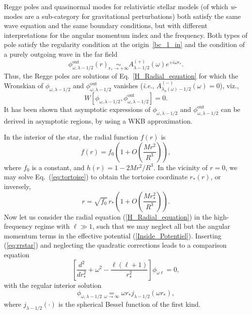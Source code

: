 \documentclass[aps,prd,longbibliography,reprint,twocolumn,amsmath,amssymb,amsfonts,showpacs,footnote,superscriptaddress]{revtex4-1}%
\newcommand{\phiout}{\phi^{\text{out}}_{\omega, \lambda-1/2}}
\newcommand{\phireg}{\phi^{}_{\omega, \lambda-1/2}}
\begin{document}
Regge poles and quasinormal modes for relativistic stellar models (of which \textit{w}-modes are a sub-category for gravitational perturbations) both satisfy the same wave equation and the same boundary conditions, but with different interpretations for the angular momentum index and the frequency. Both types of pole satisfy the regularity condition at the origin~\eqref{bc_1_in} and the condition of a purely outgoing wave in the far field
%
\begin{equation}\label{bc_pole_inf}
\phiout (r) \scriptstyle{\underset{r_\ast \to +\infty}{\sim}}
\displaystyle{  A^{(+)}_{\lambda-1/2} (\omega) e^{+i\omega r_\ast}}.
\end{equation}
%
Thus, the Regge poles are solutions of Eq.~\eqref{H_Radial_equation} for which the  Wronskian of $\phireg$ and $\phiout$ vanishes (\textit{i.e.}, $A^{(-)}_{\lambda_n(\omega)-1/2} (\omega)=0$), viz.,
\begin{equation}\label{Wronskian}
  W[\phireg, \phiout ]= 0 .
\end{equation}
It has been shown \cite{Zhang:2011pq} that asymptotic expressions of $\phireg$ and $\phiout$ can be derived in asymptotic regions, by using a WKB approximation.

In the interior of the star, the radial function $f(r)$ is
\begin{equation}
f(r) = f_0 \left(1 + O\left(\frac{M r^2}{R^3} \right) \right),
\end{equation}
where $f_0$ is a constant, and $h(r) = 1 - 2Mr^2/R^3$. In the vicinity of $r=0$, we may solve Eq.~(\ref{eq:tortoise}) to obtain the tortoise coordinate $r_\ast(r)$, or inversely,
\begin{equation}
r = \sqrt{f_0} \, r_\ast \left(1 + O\left(\frac{M r_\ast^2}{R^3} \right) \right) . \label{eq:rrstar}
\end{equation}
Now let us consider the radial equation (\ref{H_Radial_equation}) in the high-frequency regime with $\ell \gg 1$, such that we may neglect all but the angular momentum terms in the effective potential (\ref{Inside_Potentiel}). Inserting (\ref{eq:rrstar}) and neglecting the quadratic corrections leads to a comparison equation
\begin{equation}
\left[\frac{d^{2}}{dr_{\ast}^{2}}+\omega^{2} - \frac{\ell (\ell+1)}{r_\ast^2} \right] \phi_{\omega\ell}= 0,
\end{equation}
with the regular interior solution
\begin{equation}\label{Approx_origin}
  \phireg \underset{\omega \to \infty}{=} \omega r_* j_{\lambda-1/2} (\omega r_*),
\end{equation}
where $j_{\lambda-1/2}(\cdot)$ is the spherical Bessel function of the first kind.
\end{document}
